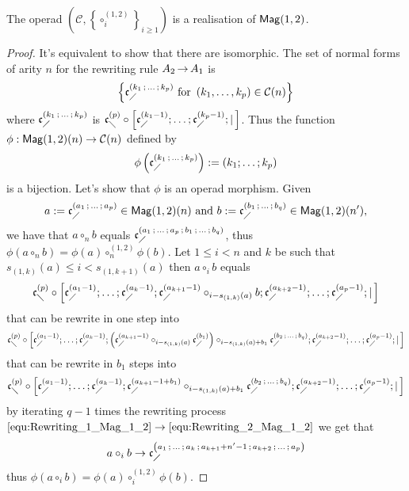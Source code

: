 \begin{Proposition} \label{prop:Realisation_Mag_1_2}
The operad
$\left(\mathcal{C}, \left\{\circ_i^{(1,2)}\right\}_{i \geq 1}\right)$
is a realisation of $\mathsf{Mag}(1,2)$.
\end{Proposition}
\begin{proof}
It's equivalent to show that there are isomorphic. The set of normal
forms of arity $n$ for the rewriting rule $A_2 \operatorname{\to} A_1$ is
\begin{equation} \label{equ:Normal_forms_A2}
\left\{ \mathfrak{c}^{\left(k_1 \, ; \, \dots \, ; \, k_p\right)}_{\diagup} \text{ for }
\left(k_1, \dots, k_p\right) \in \mathcal{C}(n) \right\}
\end{equation}
where $\mathfrak{c}^{\left(k_1 \, ; \, \dots \, ; \, k_p\right)}_{\diagup}$ is
$\mathfrak{c}^{\left(p\right)}_{\diagdown} \circ \left[\mathfrak{c}^{\left(k_1-1\right)}_{\diagup}; \dots ; \mathfrak{c}^{\left(k_p-1\right)}_{\diagup}
; | \, \right]$.
Thus the function
$\phi : \mathsf{Mag}(1,2)(n) \rightarrow \mathcal{C}(n)$ defined by
\begin{equation} \label{equ:Morphism_A2}
\phi\left( \mathfrak{c}^{\left(k_1 \, ; \, \dots \, ; \, k_p\right)}_{\diagup} \right) :=
\left(k_1 ; \dots ; k_p  \right)
\end{equation}
is a bijection. Let's show that $\phi$ is an operad morphism. Given
\begin{equation}
a := \mathfrak{c}^{\left(a_1 \, ; \, \dots \, ; \, a_p\right)}_{\diagup} \in \mathsf{Mag}(1,2)(n) \text{ and }
b := \mathfrak{c}^{\left(b_1 \, ; \, \dots \, ; \, b_q\right)}_{\diagup} \in \mathsf{Mag}(1,2)(n'),
\end{equation}
we have that $a \circ_n b$ equals $\mathfrak{c}^{\left(a_1 \, ; \, \dots \, ; \, a_p
 \, ; \, b_1 \, ; \, \dots \, ; \, b_q\right)}_{\diagup}$, thus
 $\phi\left(a \circ_n b\right) = \phi\left(a\right) \circ_n^{(1,2)}
 \phi\left(b\right)$. Let $1 \leq i < n$ and $k$ be such that
 $s_{(1, k)}(a) \leq i < s_{(1, k+1)}(a)$ then $a \circ_i b$ equals
\begin{equation} \label{equ:Rewriting_1_Mag_1_2}
\mathfrak{c}^{\left(p\right)}_{\diagdown} \circ \left[\mathfrak{c}^{\left(a_1-1\right)}_{\diagup}; \dots ; \mathfrak{c}^{\left(a_k-1\right)}_{\diagup};
\mathfrak{c}^{\left(a_{k+1}-1\right)}_{\diagup}
\circ_{i-s_{(1,k)}(a)} b  ; \mathfrak{c}^{\left(a_{k+2}-1\right)}_{\diagup} ; \dots; \mathfrak{c}^{\left(a_p-1\right)}_{\diagup} ;
| \, \right]
\end{equation}
that can be rewrite in one step into
\begin{equation}
\mathfrak{c}^{\left(p\right)}_{\diagdown} \circ \left[\mathfrak{c}^{\left(a_1-1\right)}_{\diagup}; \dots ; \mathfrak{c}^{\left(a_k-1\right)}_{\diagup}; \left(
\mathfrak{c}^{\left(a_{k+1}-1\right)}_{\diagup} \circ_{i-s_{(1,k)}(a)}  \mathfrak{c}^{\left(b_1\right)}_{\diagup} \right)
\circ_{i-s_{(1,k)}(a)+b_1} \mathfrak{c}^{\left(b_2 \, ; \, \dots \, ; \, b_q\right)}_{\diagup} ;
\mathfrak{c}^{\left(a_{k+2}-1\right)}_{\diagup} ; \dots; \mathfrak{c}^{\left(a_p-1\right)}_{\diagup} ; | \, \right]
\end{equation}
that can be rewrite in $b_1$ steps into
\begin{equation} \label{equ:Rewriting_2_Mag_1_2}
\mathfrak{c}^{\left(p\right)}_{\diagdown} \circ \left[\mathfrak{c}^{\left(a_1-1\right)}_{\diagup}; \dots ; \mathfrak{c}^{\left(a_k-1\right)}_{\diagup};
\mathfrak{c}^{\left(a_{k+1}-1+b_1\right)}_{\diagup} \circ_{i-s_{(1,k)}(a)+b_1}
\mathfrak{c}^{\left(b_2 \, ; \, \dots \, ; \, b_q\right)}_{\diagup}  ; \mathfrak{c}^{\left(a_{k+2}-1\right)}_{\diagup} ; \dots;
\mathfrak{c}^{\left(a_p-1\right)}_{\diagup} ; | \, \right]
\end{equation}
by iterating $q-1$ times the rewriting process
$\eqref{equ:Rewriting_1_Mag_1_2} \rightarrow
\eqref{equ:Rewriting_2_Mag_1_2}$ we get that
\begin{equation}
a \circ_i b \rightarrow \mathfrak{c}^{\left(a_1 \, ; \, \dots \, ; \, a_{k} \, ; \,
a_{k+1} + n'-1 \, ; \, a_{k+2} \, ; \, \dots \, ; \, a_p\right)}_{\diagup}
\end{equation}
thus $\phi(a \circ_i b) = \phi(a) \circ_i^{(1,2)} \phi(b)$.
\end{proof}

